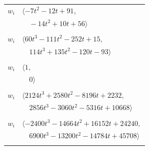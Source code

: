 \documentclass[11pt]{article}
\begin{document}
\begin{longtable}{@{}ll@{}}
$w_i$ & $\langle -7t^{2}-12t+91,$\\
 & $\quad -14t^{2}+10t+56\rangle$\\
\addlinespace[2pt]
\multicolumn{2}{@{}p{0.97\textwidth}@{}}{$i=14$, $D_i=1$, $\rho_{ij}$: $19{:}1, \allowbreak 26{:}1, \allowbreak 27{:}2, \allowbreak 32{:}1, \allowbreak 36{:}2, \allowbreak 39{:}1, \allowbreak 40{:}1, \allowbreak 63{:}1, \allowbreak 64{:}2$}\\
$w_i$ & $\langle 60t^{3}-111t^{2}-252t+15,$\\
 & $\quad 114t^{3}+135t^{2}-120t-93\rangle$\\
\addlinespace[2pt]
\multicolumn{2}{@{}p{0.97\textwidth}@{}}{$i=15$, $D_i=1$, $\rho_{ij}$: $--$}\\
$w_i$ & $\langle 1,$\\
 & $\quad 0\rangle$\\
\addlinespace[2pt]
\multicolumn{2}{@{}p{0.97\textwidth}@{}}{$i=16$, $D_i=1$, $\rho_{ij}$: $0{:}2, \allowbreak 4{:}2, \allowbreak 6{:}1, \allowbreak 8{:}2, \allowbreak 9{:}1, \allowbreak 20{:}2, \allowbreak 22{:}1, \allowbreak 24{:}2, \allowbreak 25{:}2, \allowbreak 26{:}1, \allowbreak 36{:}1, \allowbreak 38{:}1, \allowbreak 51{:}1, \allowbreak 57{:}2, \allowbreak 62{:}1, \allowbreak 65{:}2, \allowbreak 71{:}2, \allowbreak 75{:}1, \allowbreak 78{:}1, \allowbreak 95{:}2, \allowbreak 96{:}1$}\\
$w_i$ & $\langle 2124t^{3}+2580t^{2}-8196t+2232,$\\
 & $\quad 2856t^{3}-3060t^{2}-5316t+10668\rangle$\\
\addlinespace[2pt]
\multicolumn{2}{@{}p{0.97\textwidth}@{}}{$i=17$, $D_i=1$, $\rho_{ij}$: $0{:}1, \allowbreak 4{:}1, \allowbreak 6{:}1, \allowbreak 13{:}1, \allowbreak 21{:}2, \allowbreak 24{:}2, \allowbreak 27{:}2, \allowbreak 37{:}2, \allowbreak 50{:}2, \allowbreak 59{:}1, \allowbreak 62{:}2, \allowbreak 65{:}2, \allowbreak 67{:}1, \allowbreak 68{:}2, \allowbreak 74{:}1, \allowbreak 76{:}2, \allowbreak 78{:}1, \allowbreak 79{:}1, \allowbreak 84{:}2, \allowbreak 93{:}1, \allowbreak 96{:}2$}\\
$w_i$ & $\langle -2400t^{3}-14664t^{2}+16152t+24240,$\\
 & $\quad 6900t^{3}-13200t^{2}-14784t+45708\rangle$\\
\addlinespace[2pt]
\multicolumn{2}{@{}p{0.97\textwidth}@{}}{$i=18$, $D_i=1$, $\rho_{ij}$: $3{:}2, \allowbreak 9{:}2, \allowbreak 21{:}2, \allowbreak 23{:}1, \allowbreak 24{:}1, \allowbreak 32{:}1, \allowbreak 34{:}2, \allowbreak 38{:}2, \allowbreak 39{:}2, \allowbreak 56{:}2, \allowbreak 60{:}2, \allowbreak 61{:}2, \allowbreak 62{:}1, \allowbreak 63{:}1, \allowbreak 64{:}1, \allowbreak 68{:}1, \allowbreak 70{:}2, \allowbreak 72{:}1, \allowbreak 78{:}1, \allowbreak 81{:}1, \allowbreak 89{:}2$}\\

\end{longtable}
\end{document}

